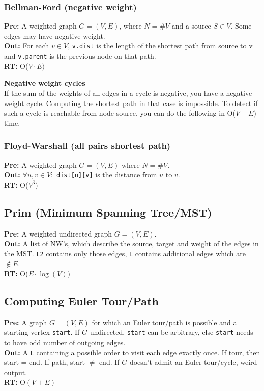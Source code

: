 \documentclass[a4paper,10pt]{article}
\begin{document}
\begin{multicols}{2}
\subsubsection{Bellman-Ford (negative weight)}
\textbf{Pre:}  A weighted graph $G=(V,E)$, where $N=\# V$ and a source $S\in V$. Some edges may have negative weight.\\
\textbf{Out:} For each $v\in V$, \lstinline|v.dist| is the length of the shortest path from source to v and \lstinline|v.parent| is the previous node on that path.\\
\textbf{RT:} O($V\cdot E)$

\textbf{Negative weight cycles}\\
If the sum of the weights of all edges in a cycle is negative, you have a negative weight cycle. Computing the shortest path in that case is impossible. To detect if such a cycle is reachable from node source, you can do the following in O($V+E$) time.


\subsubsection{Floyd-Warshall (all pairs shortest path)}
\textbf{Pre:} A weighted graph $G=(V,E)$ where $N=\# V$.\\
\textbf{Out:} $\forall u,v\in V:$ \lstinline|dist[u][v]| is the distance from $u$ to $v$.\\
\textbf{RT:} O($V^3$)


\subsection{Prim (Minimum Spanning Tree/MST)}
\textbf{Pre:} A weighted undirected graph $G=(V,E)$.\\
\textbf{Out:} A list of NW's, which describe the source, target and weight of the edges in the MST. \lstinline|L2| contains only those edges, \lstinline|L| contains additional edges which are $\not\in E$.\\
\textbf{RT:} O($E\cdot\log(V))$


\subsection{Computing Euler Tour/Path}
\textbf{Pre:} A graph $G=(V,E)$ for which an Euler tour/path is possible and a starting vertex \lstinline|start|. If $G$ undirected, \lstinline|start| can be arbitrary, else \lstinline|start| needs to have odd number of outgoing edges.\\
\textbf{Out:} A \lstinline|L| containing a possible order to visit each edge exactly once. If tour, then start = end. If path, start $\neq$ end. If $G$ doesn't admit an Euler tour/cycle, weird output.\\
\textbf{RT:} O$(V+E)$



\end{multicols}
\end{document}
